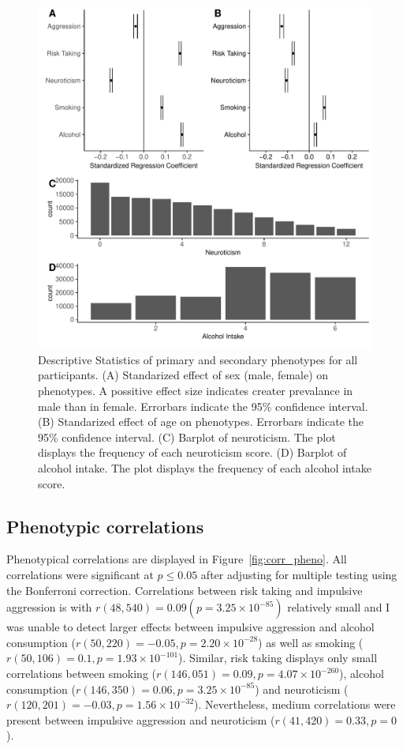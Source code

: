 \begin{figure}[htpb]
  \centering
  \includegraphics[width=0.8\linewidth]{ukb_assoc/figure/phenotype/descriptives_plots.pdf}
  \caption[Descriptive Statistics of primary and secondary phenotypes]{
    Descriptive Statistics of primary and secondary phenotypes for all participants.
    (A) Standarized effect of sex (male, female) on phenotypes. 
    A possitive effect size indicates creater prevalance in male than in female.
    Errorbars indicate the 95\% confidence interval.
    (B) Standarized effect of age on phenotypes.
    Errorbars indicate the 95\% confidence interval.
    (C) Barplot of neuroticism.
    The plot displays the frequency of each neuroticism score.
    (D) Barplot of alcohol intake.
    The plot displays the frequency of each alcohol intake score.
  }\label{fig:disc}
\end{figure}

\subsection{Phenotypic correlations}
\label{sub:phenotype_correlations}

Phenotypical correlations are displayed in Figure~\ref{fig:corr_pheno}. 
All correlations were significant at $p\leq 0.05$ after adjusting for multiple testing using the Bonferroni correction.
Correlations between risk taking and impulsive aggression is with $r(48,540)=0.09 (p=3.25\times 10^{-85})$ relatively small
and I was unable to detect larger effects between impulsive aggression and alcohol consumption ($r(50,220)=-0.05, p=2.20\times 10^{-28}$)
as well as smoking ($r(50,106)=0.1, p=1.93\times 10^{-101}$).
Similar, risk taking displays only small correlations between
smoking ($r(146,051)=0.09, p=4.07\times 10^{-260}$),
alcohol consumption ($r(146,350)=0.06, p=3.25\times 10^{-85}$)
and neuroticism ($r(120,201)=-0.03, p=1.56\times 10^{-32}$). 
Nevertheless, medium correlations were present between impulsive aggression and neuroticism ($r(41,420)=0.33, p=0$).

